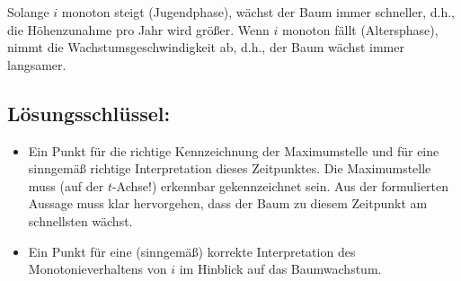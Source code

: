 \begin{langesbeispiel}
{\begin{enumerate}
		Solange $i$ monoton steigt (Jugendphase), wächst der Baum immer schneller, d.h., die Höhenzunahme pro Jahr wird größer. Wenn $i$ monoton fällt (Altersphase), nimmt die Wachstumsgeschwindigkeit ab, d.h., der Baum wächst immer langsamer.
		
	\subsection{Lösungsschlüssel:}
	
\begin{itemize}
	\item Ein Punkt für die richtige Kennzeichnung der Maximumstelle und für eine sinngemäß richtige Interpretation dieses Zeitpunktes. Die Maximumstelle muss (auf der $t$-Achse!) erkennbar gekennzeichnet sein. Aus der formulierten Aussage muss klar hervorgehen, dass der Baum zu diesem Zeitpunkt am schnellsten wächst.
	\item Ein Punkt für eine (sinngemäß) korrekte Interpretation des Monotonieverhaltens von $i$ im Hinblick auf das Baumwachstum.
\end{itemize}
\end{enumerate}}
		\end{langesbeispiel}